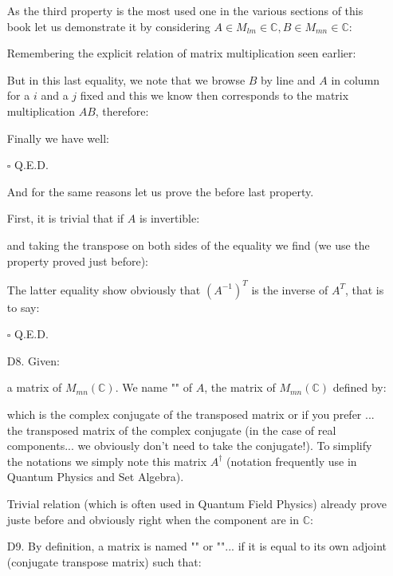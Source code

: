\begin{enumerate}
		As the third property is the most used one in the various sections of this book let us demonstrate it by considering $A\in M_{lm}\in\mathbb{C},B\in M_{mn}\in \mathbb{C}$:
		\begin{dem}
		 Remembering the explicit relation of matrix multiplication seen earlier:
		
		But in this last equality, we note that we browse $B$ by line and $A$ in column for a $i$ and a $j$ fixed and this we know then corresponds to the matrix multiplication $AB$, therefore:
		
		Finally we have well:
		
		\begin{flushright}
			$\square$  Q.E.D.
		\end{flushright}
		\end{dem}
		And for the same reasons let us prove the before last property.
		\begin{dem}
		First, it is trivial that if $A$ is invertible:
		
		and taking the transpose on both sides of the equality we find (we use the property proved just before):
		
		The latter equality show obviously that $(A^{-1})^T$ is the inverse of $A^T$, that is to say:
		\begin{flushright}
			$\square$  Q.E.D.
		\end{flushright}
		\end{dem}
		
		\item[D8.] Given:
		
		a matrix of $M_{mn}(\mathbb{C})$. We name "" of $A$, the matrix of $M_{mn}(\mathbb{C})$ defined by:
		
		which is the complex conjugate of the transposed matrix or if you prefer ... the transposed matrix of the complex conjugate (in the case of real components... we obviously don't need to take the conjugate!). To simplify the notations we simply note this matrix $A^\dagger$ (notation frequently use in Quantum Physics and Set Algebra).
		\begin{tcolorbox}[title=Remark,colframe=black,arc=10pt]
		Trivial relation (which is often used in Quantum Field Physics) already prove juste before and obviously right when the component are in $\mathbb{C}$:
		
		\end{tcolorbox}
		
		\item[D9.] By definition, a matrix is named "" or ""... if it is equal to its own adjoint (conjugate transpose matrix) such that:
		

\end{enumerate}
